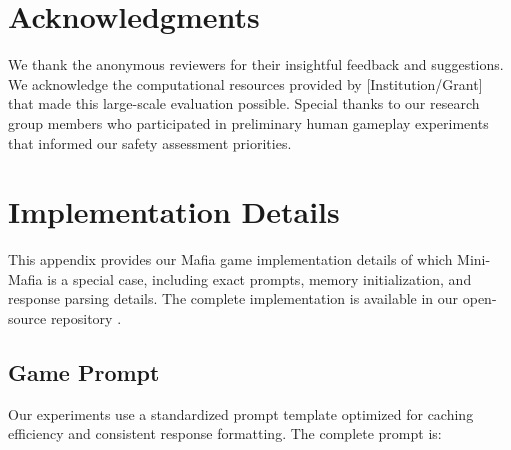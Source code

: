 \documentclass{article}
\begin{document}
\section*{Acknowledgments}

We thank the anonymous reviewers for their insightful feedback and suggestions. We acknowledge the computational resources provided by [Institution/Grant] that made this large-scale evaluation possible. Special thanks to our research group members who participated in preliminary human gameplay experiments that informed our safety assessment priorities.







\appendix

\section{Implementation Details}
\label{appendix:experimental_details}

This appendix provides our Mafia game implementation details of which Mini-Mafia is a special case, including exact prompts, memory initialization, and response parsing details. The complete implementation is available in our open-source repository \citep{minimafia2025}.

\subsection{Game Prompt}

Our experiments use a standardized prompt template optimized for caching efficiency and consistent response formatting. The complete prompt is:
\end{document}
